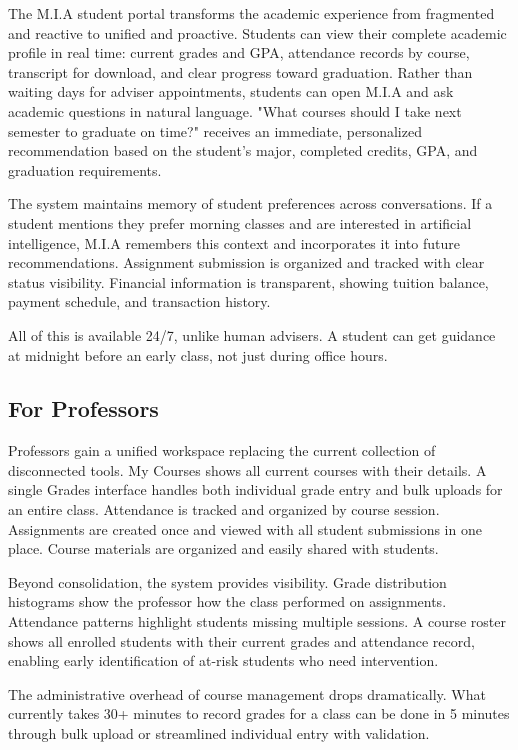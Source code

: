 \documentclass[12pt,a4paper]{report}
\begin{document}
The M.I.A student portal transforms the academic experience from fragmented and reactive to unified and proactive. Students can view their complete academic profile in real time: current grades and GPA, attendance records by course, transcript for download, and clear progress toward graduation. Rather than waiting days for adviser appointments, students can open M.I.A and ask academic questions in natural language. "What courses should I take next semester to graduate on time?" receives an immediate, personalized recommendation based on the student's major, completed credits, GPA, and graduation requirements.

The system maintains memory of student preferences across conversations. If a student mentions they prefer morning classes and are interested in artificial intelligence, M.I.A remembers this context and incorporates it into future recommendations. Assignment submission is organized and tracked with clear status visibility. Financial information is transparent, showing tuition balance, payment schedule, and transaction history.

All of this is available 24/7, unlike human advisers. A student can get guidance at midnight before an early class, not just during office hours.

\subsection{For Professors}

Professors gain a unified workspace replacing the current collection of disconnected tools. My Courses shows all current courses with their details. A single Grades interface handles both individual grade entry and bulk uploads for an entire class. Attendance is tracked and organized by course session. Assignments are created once and viewed with all student submissions in one place. Course materials are organized and easily shared with students.

Beyond consolidation, the system provides visibility. Grade distribution histograms show the professor how the class performed on assignments. Attendance patterns highlight students missing multiple sessions. A course roster shows all enrolled students with their current grades and attendance record, enabling early identification of at-risk students who need intervention.

The administrative overhead of course management drops dramatically. What currently takes 30+ minutes to record grades for a class can be done in 5 minutes through bulk upload or streamlined individual entry with validation.
\end{document}
